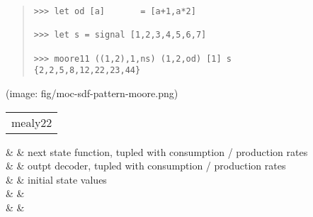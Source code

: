 \begin{haddockdesc}
\begin{quote}
{\begin{verbatim}
>>> let od [a]       = [a+1,a*2]

>>> let s = signal [1,2,3,4,5,6,7]

>>> moore11 ((1,2),1,ns) (1,2,od) [1] s
{2,2,5,8,12,22,23,44}

\end{verbatim}}
\end{quote}(image: fig/moc-sdf-pattern-moore.png)\par
           
\end{haddockdesc}
\begin{haddockdesc}
\item[\begin{tabular}{@{}l}
mealy22
\end{tabular}]\haddockbegindoc
\haddockbeginargs
\haddockdecltt{::} &  & next state function, tupled with consumption / production
 rates \\
                                                                                 \haddockdecltt{->} &  & outpt decoder, tupled with consumption / production rates \\
                                                                                                                                                                                  \haddockdecltt{->} & \haddockdecltt{[st]} & initial state values \\
                                                                                                                                                                                                                              \haddockdecltt{->} &  & \\
                                                                                                                                                                                                                                                                               \haddockdecltt{->} &  & \\

\end{haddockdesc}
